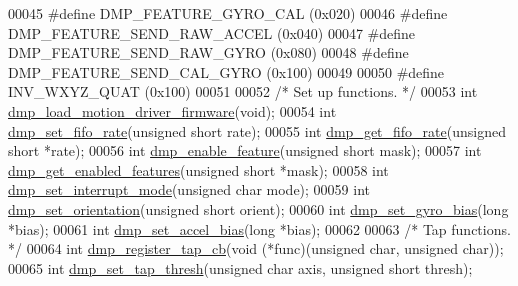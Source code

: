 \begin{DoxyCode}
00045 \textcolor{preprocessor}{#define DMP\_FEATURE\_GYRO\_CAL        (0x020)}
00046 \textcolor{preprocessor}{#define DMP\_FEATURE\_SEND\_RAW\_ACCEL  (0x040)}
00047 \textcolor{preprocessor}{#define DMP\_FEATURE\_SEND\_RAW\_GYRO   (0x080)}
00048 \textcolor{preprocessor}{#define DMP\_FEATURE\_SEND\_CAL\_GYRO   (0x100)}
00049 
00050 \textcolor{preprocessor}{#define INV\_WXYZ\_QUAT       (0x100)}
00051 
00052 \textcolor{comment}{/* Set up functions. */}
00053 \textcolor{keywordtype}{int} \hyperlink{group___d_r_i_v_e_r_s_ga66626a842452f444e9af29cb0d2c6150}{dmp\_load\_motion\_driver\_firmware}(\textcolor{keywordtype}{void});
00054 \textcolor{keywordtype}{int} \hyperlink{group___d_r_i_v_e_r_s_ga5399728fd572a7694af20286cc9d4121}{dmp\_set\_fifo\_rate}(\textcolor{keywordtype}{unsigned} \textcolor{keywordtype}{short} rate);
00055 \textcolor{keywordtype}{int} \hyperlink{group___d_r_i_v_e_r_s_gaf3f9953bc04af751b1101700daffa951}{dmp\_get\_fifo\_rate}(\textcolor{keywordtype}{unsigned} \textcolor{keywordtype}{short} *rate);
00056 \textcolor{keywordtype}{int} \hyperlink{group___d_r_i_v_e_r_s_ga70c485bdfa30515e5b869b081192caa1}{dmp\_enable\_feature}(\textcolor{keywordtype}{unsigned} \textcolor{keywordtype}{short} mask);
00057 \textcolor{keywordtype}{int} \hyperlink{group___d_r_i_v_e_r_s_ga92b920b72f5146ea14d45ad2d529b64c}{dmp\_get\_enabled\_features}(\textcolor{keywordtype}{unsigned} \textcolor{keywordtype}{short} *mask);
00058 \textcolor{keywordtype}{int} \hyperlink{group___d_r_i_v_e_r_s_gaf10c08103d2aec9aa5555a5694bafced}{dmp\_set\_interrupt\_mode}(\textcolor{keywordtype}{unsigned} \textcolor{keywordtype}{char} mode);
00059 \textcolor{keywordtype}{int} \hyperlink{group___d_r_i_v_e_r_s_ga6cb5ff144ce6e1546f00809de8bb24a4}{dmp\_set\_orientation}(\textcolor{keywordtype}{unsigned} \textcolor{keywordtype}{short} orient);
00060 \textcolor{keywordtype}{int} \hyperlink{group___d_r_i_v_e_r_s_ga4766e37ef95cbf0044c8f9594ed811d1}{dmp\_set\_gyro\_bias}(\textcolor{keywordtype}{long} *bias);
00061 \textcolor{keywordtype}{int} \hyperlink{group___d_r_i_v_e_r_s_gafbd714aee6086836f70aaea847771669}{dmp\_set\_accel\_bias}(\textcolor{keywordtype}{long} *bias);
00062 
00063 \textcolor{comment}{/* Tap functions. */}
00064 \textcolor{keywordtype}{int} \hyperlink{group___d_r_i_v_e_r_s_ga8a2df36126e34b78863e3acf1249d814}{dmp\_register\_tap\_cb}(\textcolor{keywordtype}{void} (*func)(\textcolor{keywordtype}{unsigned} \textcolor{keywordtype}{char}, \textcolor{keywordtype}{unsigned} \textcolor{keywordtype}{char}));
00065 \textcolor{keywordtype}{int} \hyperlink{group___d_r_i_v_e_r_s_ga15da67c0a6c94e0cdaceb8b165e13af9}{dmp\_set\_tap\_thresh}(\textcolor{keywordtype}{unsigned} \textcolor{keywordtype}{char} axis, \textcolor{keywordtype}{unsigned} \textcolor{keywordtype}{short} thresh);

\end{DoxyCode}
